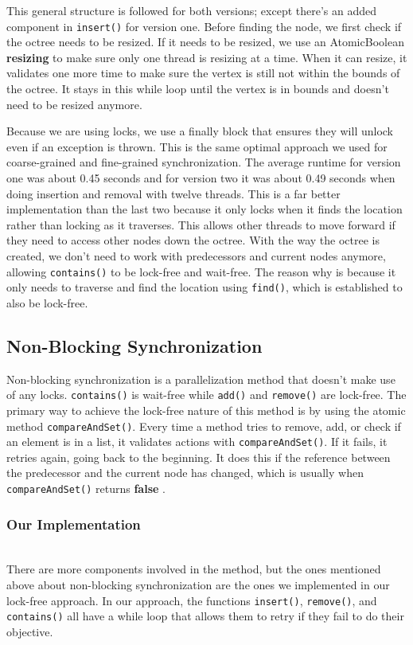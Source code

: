 \documentclass[conference]{IEEEtran}
\begin{document}
\indent \indent This general structure is followed for both versions; except there's an added component in \verb|insert()| for version one. Before finding the node, we first check if the octree needs to be resized. If it needs to be resized, we use an AtomicBoolean \textbf{resizing} to make sure only one thread is resizing at a time. When it can resize, it validates one more time to make sure the vertex is still not within the bounds of the octree. It stays in this while loop until the vertex is in bounds and doesn't need to be resized anymore.

\indent \indent Because we are using locks, we use a finally block that ensures they will unlock even if an exception is thrown. This is the same optimal approach we used for coarse-grained and fine-grained synchronization. The average runtime for version one was about 0.45 seconds and for version two it was about 0.49 seconds when doing insertion and removal with twelve threads. This is a far better implementation than the last two because it only locks when it finds the location rather than locking as it traverses. This allows other threads to move forward if they need to access other nodes down the octree. With the way the octree is created, we don't need to work with predecessors and current nodes anymore, allowing \verb|contains()| to be lock-free and wait-free. The reason why is because it only needs to traverse and find the location using \verb|find()|, which is established to also be lock-free.

\subsection{Non-Blocking Synchronization}
Non-blocking synchronization is a parallelization method that doesn't make use of any locks. \verb|contains()| is wait-free while \verb|add()| and \verb|remove()| are lock-free. The primary way to achieve the lock-free nature of this method is by using the atomic method \verb|compareAndSet()|. Every time a method tries to remove, add, or check if an element is in a list, it validates actions with \verb|compareAndSet()|. If it fails, it retries again, going back to the beginning. It does this if the reference between the predecessor and the current node has changed, which is usually when \verb|compareAndSet()| returns \textbf{false} \cite{textbook}.


\subsubsection{Our Implementation}~\\
\indent \indent There are more components involved in the method, but the ones mentioned above about non-blocking synchronization are the ones we implemented in our lock-free approach. In our approach, the functions \verb|insert()|, \verb|remove()|, and \verb|contains()| all have a while loop that allows them to retry if they fail to do their objective.
\end{document}
